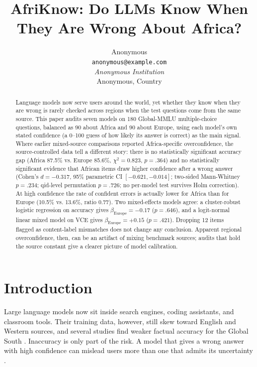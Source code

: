 \documentclass[11pt]{article}
\title{AfriKnow: Do LLMs Know When They Are Wrong About Africa?}
\author{
Anonymous \\
\texttt{anonymous@example.com} \\
\textit{Anonymous Institution} \\
Anonymous, Country
}
\begin{document}
\maketitle

\begin{abstract}
Language models now serve users around the world, yet whether they know when they are wrong is rarely checked across regions when the test questions come from the same source. This paper audits seven models on 180 Global-MMLU multiple-choice questions, balanced as 90 about Africa and 90 about Europe, using each model's own stated confidence (a 0--100 guess of how likely its answer is correct) as the main signal. Where earlier mixed-source comparisons reported Africa-specific overconfidence, the source-controlled data tell a different story: there is no statistically significant accuracy gap (Africa 87.5\% vs. Europe 85.6\%, $\chi^2 = 0.823$, $p = .364$) and no statistically significant evidence that African items draw higher confidence after a wrong answer (Cohen's $d = -0.317$, 95\% parametric CI $[-0.621, -0.014]$; two-sided Mann-Whitney $p = .234$; qid-level permutation $p = .726$; no per-model test survives Holm correction). At high confidence the rate of confident errors is actually lower for Africa than for Europe (10.5\% vs. 13.6\%, ratio 0.77). Two mixed-effects models agree: a cluster-robust logistic regression on accuracy gives $\beta_\text{Europe} = -0.17$ ($p = .646$), and a logit-normal linear mixed model on VCE gives $\beta_\text{Europe} = +0.15$ ($p = .421$). Dropping 12 items flagged as content-label mismatches does not change any conclusion. Apparent regional overconfidence, then, can be an artifact of mixing benchmark sources; audits that hold the source constant give a clearer picture of model calibration.
\end{abstract}

\section{Introduction}
\label{sec:intro}

Large language models now sit inside search engines, coding assistants, and classroom tools. Their training data, however, still skew toward English and Western sources, and several studies find weaker factual accuracy for the Global South \cite{mirza2024global,moayeri2024worldbench,decoupes2025geographical}. Inaccuracy is only part of the risk. A model that gives a wrong answer with high confidence can mislead users more than one that admits its uncertainty \cite{steyvers2024calibration,geng2024survey}.
\end{document}
